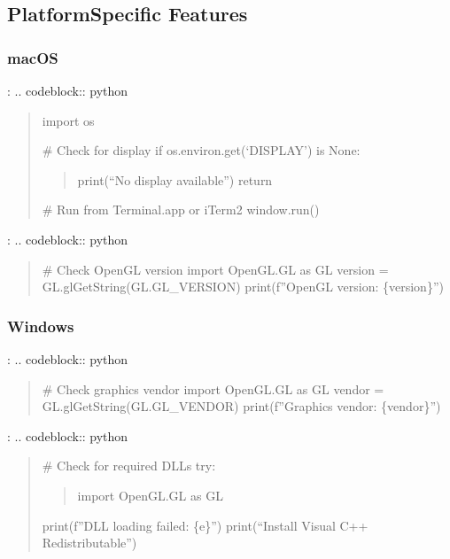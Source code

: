 \documentclass[a4paper,10pt,english,openany,oneside]{sphinxmanual}
\begin{document}
\subsection{Platform\sphinxhyphen{}Specific Features}
\label{\detokenize{api/ui:platform-specific-features}}

\subsubsection{macOS}
\label{\detokenize{api/ui:macos}}
\sphinxAtStartPar
{}:
.. code\sphinxhyphen{}block:: python
\begin{quote}

\sphinxAtStartPar
import os

\sphinxAtStartPar
\# Check for display
if os.environ.get(‘DISPLAY’) is None:
\begin{quote}

\sphinxAtStartPar
print(“No display available”)
return
\end{quote}

\sphinxAtStartPar
\# Run from Terminal.app or iTerm2
window.run()
\end{quote}

\sphinxAtStartPar
{}:
.. code\sphinxhyphen{}block:: python
\begin{quote}

\sphinxAtStartPar
\# Check OpenGL version
import OpenGL.GL as GL
version = GL.glGetString(GL.GL\_VERSION)
print(f”OpenGL version: \{version\}”)
\end{quote}


\subsubsection{Windows}
\label{\detokenize{api/ui:windows}}
\sphinxAtStartPar
{}:
.. code\sphinxhyphen{}block:: python
\begin{quote}

\sphinxAtStartPar
\# Check graphics vendor
import OpenGL.GL as GL
vendor = GL.glGetString(GL.GL\_VENDOR)
print(f”Graphics vendor: \{vendor\}”)
\end{quote}

\sphinxAtStartPar
{}:
.. code\sphinxhyphen{}block:: python
\begin{quote}

\sphinxAtStartPar
\# Check for required DLLs
try:
\begin{quote}

\sphinxAtStartPar
import OpenGL.GL as GL
\end{quote}
\begin{description}
\sphinxAtStartPar
print(f”DLL loading failed: \{e\}”)
print(“Install Visual C++ Redistributable”)

\end{description}
\end{quote}
\end{document}
